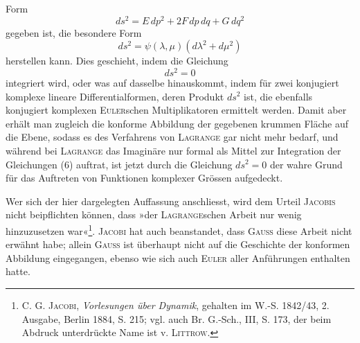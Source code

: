 \clearpage{}\setcounter{footnote}{0}
\noindent Form
\begin{equation}ds^2=E\,dp^2+2F\,dp\,dq+G\,dq^2\tag*{(10)}\end{equation}
\noindent gegeben ist, die besondere Form
\begin{equation}ds^2=\psi(\lambda,\mu)(d\lambda^2+d\mu^2)\tag*{(11)}\end{equation}
\noindent herstellen kann. Dies geschieht, indem die Gleichung
\begin{equation}ds^2=0\tag*{(12)}\end{equation}
\noindent integriert wird, oder was auf dasselbe hinauskommt, indem für zwei konjugiert
komplexe lineare Differentialformen, deren Produkt \(ds^2\) ist, die ebenfalls konjugiert
komplexen \textsc{Euler}schen Multiplikatoren ermittelt werden. Damit aber
erhält man zugleich die  konforme Abbildung der gegebenen
krummen Fläche auf die Ebene, sodass es des Verfahrens von \textsc{Lagrange} gar
nicht mehr bedarf, und während bei \textsc{Lagrange} das Imaginäre nur formal als
Mittel zur Integration der Gleichungen (6) auftrat, ist jetzt durch die Gleichung
\(ds^2=0\) der wahre Grund für das Auftreten von Funktionen komplexer Grössen
aufgedeckt.
\par
Wer sich der hier dargelegten Auffassung anschliesst, wird dem Urteil
\textsc{Jacobis} nicht beipflichten können, dass »der \textsc{Lagrange}schen Arbeit nur wenig
hinzuzusetzen war«\footnote{C. G. \textsc{Jacobi}, \textit{Vorlesungen über Dynamik}, gehalten im W.-S. 1842/43, 2. Ausgabe, Berlin 1884, S. 215; vgl. auch Br. G.-Sch., III, S. 173, der beim Abdruck unterdrückte Name ist v. \textsc{Littrow}.}. \textsc{Jacobi} hat auch beanstandet, dass \textsc{Gauss} diese Arbeit
nicht erwähnt habe; allein \textsc{Gauss} ist überhaupt nicht auf die Geschichte der
konformen Abbildung eingegangen, ebenso wie sich auch \textsc{Euler} aller Anführungen
enthalten hatte.
\clearpage\endgroup
